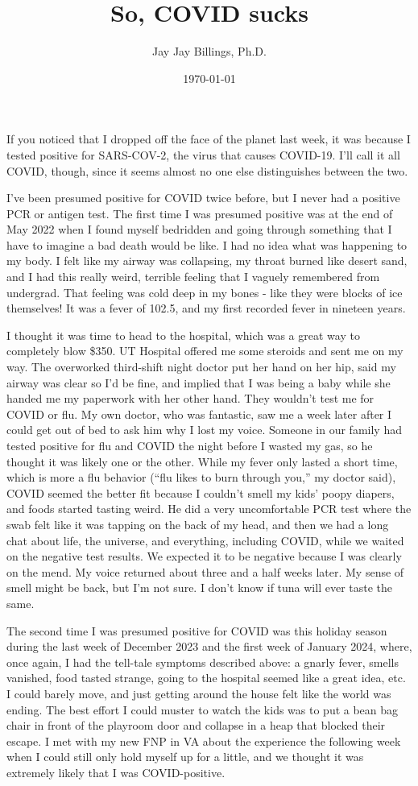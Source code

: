 \documentclass{article}
\title{So, COVID sucks}
\author{Jay Jay Billings, Ph.D.}
\date{\today}
\begin{document}
\maketitle
If you noticed that I dropped off the face of the planet last week, it was because I tested positive for SARS-COV-2, the virus that causes COVID-19. I'll call it all COVID, though, since it seems almost no one else distinguishes between the two. 

I've been presumed positive for COVID twice before, but I never had a positive PCR or antigen test. The first time I was presumed positive was at the end of May 2022 when I found myself bedridden and going through something that I have to imagine a bad death would be like. I had no idea what was happening to my body. I felt like my airway was collapsing, my throat burned like desert sand, and I had this really weird, terrible feeling that I vaguely remembered from undergrad. That feeling was cold deep in my bones - like they were blocks of ice themselves! It was a fever of 102.5, and my first recorded fever in nineteen years.

I thought it was time to head to the hospital, which was a great way to completely blow \$350. UT Hospital offered me some steroids and sent me on my way. The overworked third-shift night doctor put her hand on her hip, said my airway was clear so I'd be fine, and implied that I was being a baby while she handed me my paperwork with her other hand. They wouldn't test me for COVID or flu. My own doctor, who was fantastic, saw me a week later after I could get out of bed to ask him why I lost my voice. Someone in our family had tested positive for flu and COVID the night before I wasted my gas, so he thought it was likely one or the other. While my fever only lasted a short time, which is more a flu behavior (``flu likes to burn through you,'' my doctor said), COVID seemed the better fit because I couldn't smell my kids' poopy diapers, and foods started tasting weird. He did a very uncomfortable PCR test where the swab felt like it was tapping on the back of my head, and then we had a long chat about life, the universe, and everything, including COVID, while we waited on the negative test results. We expected it to be negative because I was clearly on the mend. My voice returned about three and a half weeks later. My sense of smell might be back, but I'm not sure. I don't know if tuna will ever taste the same.

The second time I was presumed positive for COVID was this holiday season during the last week of December 2023 and the first week of January 2024, where, once again, I had the tell-tale symptoms described above: a gnarly fever, smells vanished, food tasted strange, going to the hospital seemed like a great idea, etc. I could barely move, and just getting around the house felt like the world was ending. The best effort I could muster to watch the kids was to put a bean bag chair in front of the playroom door and collapse in a heap that blocked their escape. I met with my new FNP in VA about the experience the following week when I could still only hold myself up for a little, and we thought it was extremely likely that I was COVID-positive. 
\end{document}
